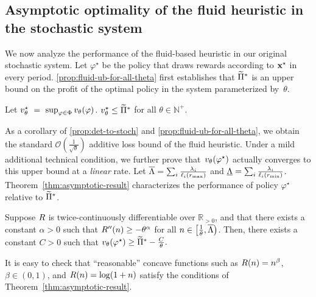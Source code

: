 \documentclass[12pt]{article}
\begin{document}
\subsection{Asymptotic optimality of the fluid heuristic in the stochastic system}

We now analyze the performance of the fluid-based heuristic in our original stochastic system. Let $\varphi^\star$ be the policy that draws rewards according to $\mathbf{x}^\star$ in every period. 
\cref{prop:fluid-ub-for-all-theta} first establishes that $\widetilde{\Pi}^*$ is an upper bound on the profit of the optimal policy in the system parameterized by~$\theta$.


\begin{proposition}\label{prop:fluid-ub-for-all-theta}
Let $v_{\theta}^\star~=~ \sup_{\varphi\in\Phi}v_{\theta}(\varphi)$. $v^\star_\theta \leq \widetilde{\Pi}^*$ for all $\theta \in \mathbb{N}^+$.
\end{proposition}




{
As a corollary of \cref{prop:det-to-stoch} and \cref{prop:fluid-ub-for-all-theta}, we obtain the standard $\mathcal{O}\left(\frac{1}{\sqrt{\theta}}\right)$ additive {loss} bound of the fluid heuristic. {Under a mild additional technical condition, we further prove that~$v_{\theta}(\varphi^\star)$ actually converges to this upper bound at a {\it linear} rate.}
Let {$\overline{\Lambda} = \sum_i \frac{\lambda_i}{\ell_i(r_{\max})}$ and $\underline{\Lambda} = \sum_i \frac{\lambda_i}{\ell_i(r_{\min})}$}. Theorem~\ref{thm:asymptotic-result} characterizes the performance of policy $\varphi^\star$ relative to $\widetilde{\Pi}^*$. }%


\begin{theorem}\label{thm:asymptotic-result}
Suppose $R$ is twice-continuously differentiable over $\mathbb{R}_{> 0}$, and that there exists a constant $\alpha > 0$ such that $R''(n) \geq -\theta^{\alpha}$ for all $n \in \left[\frac1\theta,\overline{\Lambda}\right)$. Then, there exists a constant $C > 0$ such that  $v_{\theta}(\varphi^\star) \geq {\widetilde{\Pi}^*} - \frac{C}{\theta}.$
\end{theorem}



It is easy to check that ``reasonable'' concave functions such as $R(n) = n^{\beta}$, $\beta \in (0,1)$, and $R(n) = \log(1+n)$ satisfy the conditions of Theorem~\ref{thm:asymptotic-result}.
\end{document}
